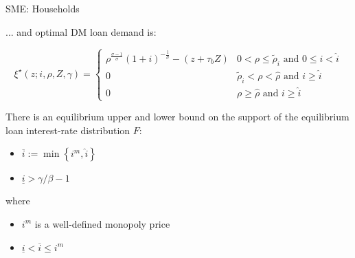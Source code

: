 \documentclass[10pt,english,slidetop,compress,
              blue,mathserif,color=option]{beamer}
\theoremstyle{plain}
\theoremstyle{definition}
\begin{document}
\begin{frame}[allowframebreaks]{SME: Households}

    \break

    ... and optimal DM loan demand is:

      \begin{equation}
        \xi^{\star}\left(z;i,\rho,Z,\gamma\right) =
        \begin{cases}
          \rho^{\frac{\sigma-1}{\sigma}}\left(1+i\right)^{-\frac{1}{\sigma}}-\left(z+\tau_{b}Z\right) &
          0 < \rho \leq \tilde{\rho}_i \text{ and } 0 \leq   i < \hat{i}
          \\
          0 & \tilde{\rho}_i<\rho<\hat{\rho}\text{ and } i \geq \hat{i}
          \\
          0 & \rho\geq\hat{\rho} \text{ and } i \geq \hat{i}
        \end{cases}
      \end{equation}

    \break

    There is an equilibrium upper and lower bound on the support of the equilibrium loan interest-rate distribution $F$:

    \begin{itemize}
      \item $\overline{i} := \min \left\{ i^{m}, \hat{i}\right\}$
      \item $\underline{i} > \gamma/\beta - 1$
    \end{itemize}

    where

    \begin{itemize}
      \item $i^{m}$ is a well-defined monopoly price
      \item $\underline{i} < \overline{i} \leq i^{m}$
    \end{itemize}



\end{frame}
\end{document}
